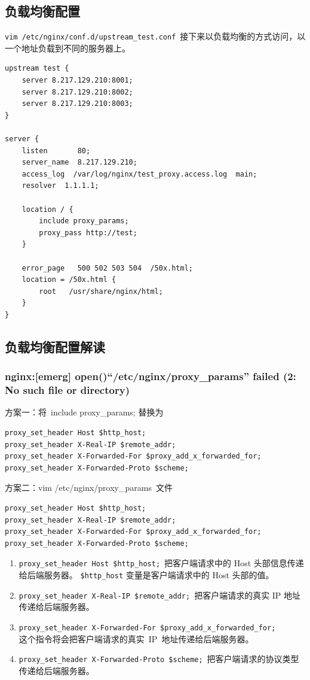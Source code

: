 \documentclass[12pt, a4paper]{article} %
\begin{document}
\begin{CJK*}{UTF8}{gbsn}
\subsection{负载均衡配置}
\verb|vim /etc/nginx/conf.d/upstream_test.conf|~接下来以负载均衡的方式访问，以一个地址负载到不同的服务器上。

\begin{lstlisting}
upstream test {
    server 8.217.129.210:8001;
    server 8.217.129.210:8002;
    server 8.217.129.210:8003;
}

server {
    listen       80;
    server_name  8.217.129.210;
    access_log  /var/log/nginx/test_proxy.access.log  main;
    resolver  1.1.1.1;

    location / {
        include proxy_params;
        proxy_pass http://test;
    }

    error_page   500 502 503 504  /50x.html;
    location = /50x.html {
        root   /usr/share/nginx/html;
    }
}
\end{lstlisting}

\subsection{负载均衡配置解读}

\subsubsection{nginx:[emerg] open()“/etc/nginx/proxy\_params” failed (2: No such file or directory)}

方案一：将~include proxy\_params; 替换为

\begin{lstlisting}
proxy_set_header Host $http_host;
proxy_set_header X-Real-IP $remote_addr;
proxy_set_header X-Forwarded-For $proxy_add_x_forwarded_for;
proxy_set_header X-Forwarded-Proto $scheme;
\end{lstlisting}

方案二：vim /etc/nginx/proxy\_params~文件

\begin{lstlisting}
proxy_set_header Host $http_host;
proxy_set_header X-Real-IP $remote_addr;
proxy_set_header X-Forwarded-For $proxy_add_x_forwarded_for;
proxy_set_header X-Forwarded-Proto $scheme;
\end{lstlisting}

\begin{enumerate}
    \item \verb|proxy_set_header Host $http_host;|~把客户端请求中的 Host 头部信息传递给后端服务器。
    \verb|$http_host| 变量是客户端请求中的 Host 头部的值。
    \item \verb|proxy_set_header X-Real-IP $remote_addr;|~把客户端请求的真实 IP 地址传递给后端服务器。
    \item \verb|proxy_set_header X-Forwarded-For $proxy_add_x_forwarded_for;|\\这个指令将会把客户端请求的真实~IP~地址传递给后端服务器。
    \item \verb|proxy_set_header X-Forwarded-Proto $scheme;|~把客户端请求的协议类型传递给后端服务器。
\end{enumerate}


\end{CJK*}
\end{document}
